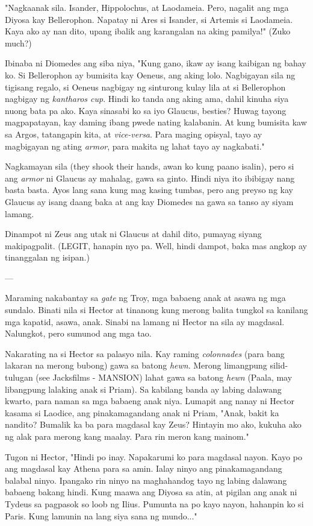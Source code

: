 \documentclass[12pt,letterpaper]{report}
\begin{document}
"Nagkaanak sila. Isander, Hippolochus, at Laodameia. Pero, nagalit ang mga Diyosa kay Bellerophon. Napatay ni Ares si Isander, si Artemis si Laodameia. Kaya ako ay nan dito, upang ibalik ang karangalan na aking pamilya!" (Zuko much?)

Ibinaba ni Diomedes ang siba niya, "Kung gano, ikaw ay isang kaibigan ng bahay ko. Si Bellerophon ay bumisita kay Oeneus, ang aking lolo. Nagbigayan sila ng tigisang regalo, si Oeneus nagbigay ng sinturong kulay lila at si Bellerophon nagbigay ng \textit{kantharos cup}. Hindi ko tanda ang aking ama, dahil kinuha siya nuong bata pa ako. Kaya sinasabi ko sa iyo Glaucus, besties? Huwag tayong magpapatayan, kay daming ibang pwede nating kalabanin. At kung bumisita kaw sa Argos, tatangapin kita, at \textit{vice-versa}. Para maging opisyal, tayo ay magbigayan ng ating \textit{armor}, para makita ng lahat tayo ay nagkabati."

Nagkamayan sila (they shook their hands, awan ko kung paano isalin), pero si ang \textit{armor} ni Glaucus ay mahalag, gawa sa ginto. Hindi niya ito ibibigay nang basta basta. Ayos lang sana kung mag kasing tumbas, pero ang preyso ng kay Glaucus ay isang daang baka at ang kay Diomedes na gawa sa tanso ay siyam lamang.

Dinampot ni Zeus ang utak ni Glaucus at dahil dito, pumayag siyang makipagpalit. (LEGIT, hanapin nyo pa. Well, hindi dampot, baka mas angkop ay tinanggalan ng isipan.)

---

Maraming nakabantay sa \textit{gate} ng Troy, mga babaeng anak at asawa ng mga sundalo. Binati nila si Hector at tinanong kung merong balita tungkol sa kanilang mga kapatid, asawa, anak. Sinabi na lamang ni Hector na sila ay magdasal. Nalungkot, pero sumunod ang mga tao.

Nakarating na si Hector sa palasyo nila. Kay raming \textit{colonnades} (para bang lakaran na merong bubong) gawa sa batong \textit{hewn}. Merong limangpung silid-tulugan (see Jacksfilms - MANSION) lahat gawa sa batong \textit{hewn} (Paala, may libangpung lalaking anak si Priam). Sa kabilang banda ay labing dalawang kwarto, para naman sa mga babaeng anak niya. Lumapit ang nanay ni Hector kasama si Laodice, ang pinakamagandang anak ni Priam, "Anak, bakit ka nandito? Bumalik ka ba para magdasal kay Zeus? Hintayin mo ako, kukuha ako ng alak para merong kang maalay. Para rin meron kang mainom."

Tugon ni Hector, "Hindi po inay. Napakarumi ko para magdasal nayon. Kayo po ang magdasal kay Athena para sa amin. Ialay ninyo ang pinakamagandang balabal ninyo. Ipangako rin ninyo na maghahandog tayo ng labing dalawang babaeng bakang hindi. Kung maawa ang Diyosa sa atin, at pigilan ang anak ni Tydeus sa pagpasok so loob ng Ilius. Pumunta na po kayo nayon, hahanpin ko si Paris. Kung lamunin na lang siya sana ng mundo..." 
\end{document}
